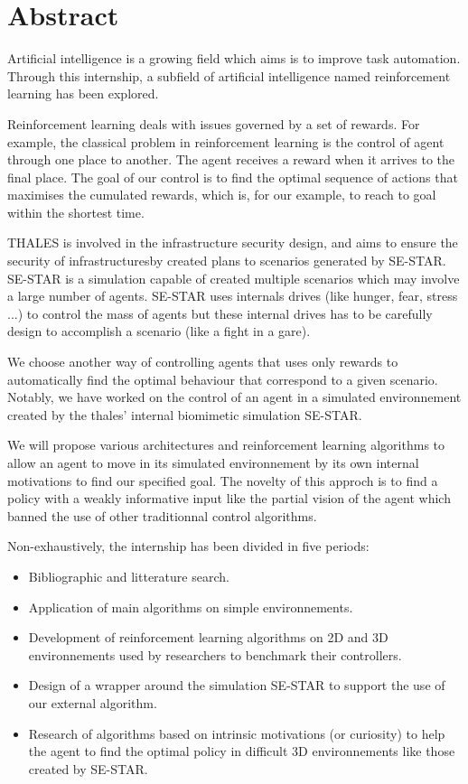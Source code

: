 \section*{Abstract}
\bigskip

Artificial intelligence is a growing field which aims is to improve task automation. Through this internship, a subfield of artificial intelligence named reinforcement learning has been explored.

Reinforcement learning deals with issues governed by a set of rewards. For example, the classical problem in reinforcement learning is the control of agent through one place to another. The agent receives a reward when it arrives to the final place.  The goal of our control is to find the optimal sequence of actions that maximises the cumulated rewards, which is, for our example, to reach to goal within the shortest time.

THALES is involved in the infrastructure security design, and aims to ensure the security of infrastructuresby created plans to scenarios generated by SE-STAR. 
SE-STAR is a simulation capable of created multiple scenarios which may involve a large number of agents. SE-STAR uses internals drives (like hunger, fear, stress ...) to control the mass of agents but these internal drives has to be carefully design to accomplish a scenario (like a fight in a gare).

We choose another way of controlling agents that uses only rewards to automatically find the optimal behaviour that correspond to a given scenario.
Notably, we have worked on the control of an agent in a simulated environnement created by the thales' internal biomimetic simulation SE-STAR.

We will propose various architectures and reinforcement learning algorithms to allow an agent to move in its simulated environnement by its own internal motivations to find our specified goal. The novelty of this approch is to find a policy with a weakly informative input like the partial vision of the agent which banned the use of other traditionnal control algorithms. 

Non-exhaustively, the internship has been divided in five periods:

\begin{itemize}
    \item Bibliographic and litterature search.
    \item Application of main algorithms on simple environnements.
    \item Development of reinforcement learning algorithms on 2D and 3D environnements used by researchers to benchmark their controllers. 
    \item Design of a wrapper around the simulation SE-STAR to support the use of our external algorithm.
    \item Research of algorithms based on intrinsic motivations (or curiosity) to help the agent to find the optimal policy in difficult 3D environnements like those created by SE-STAR. 
\end{itemize} 

